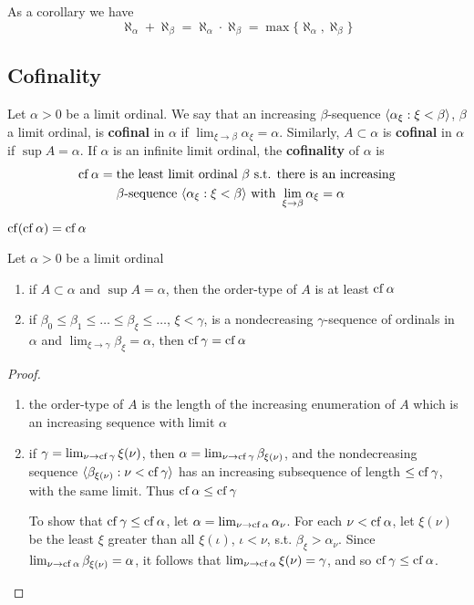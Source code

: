 \documentclass[11pt]{article}
\begin{document}
As a corollary we have
\begin{equation*}
\aleph_\alpha+\aleph_\beta=\aleph_\alpha\cdot\aleph_\beta=\max\{\aleph_\alpha,\aleph_\beta\}
\end{equation*}
\subsection{Cofinality}
\label{sec:org56e0ac6}
Let \(\alpha>0\) be a limit ordinal. We say that an increasing \(\beta\)-sequence \(\langle\alpha_\xi:\xi<\beta\rangle\), \(\beta\) a limit
ordinal, is \textbf{cofinal} in \(\alpha\) if \(\lim_{\xi\to\beta}\alpha_\xi=\alpha\). Similarly, \(A\subset\alpha\) is \textbf{cofinal} in \(\alpha\)
if \(\sup A=\alpha\). If \(\alpha\) is an infinite limit ordinal, the \textbf{cofinality} of \(\alpha\) is
\begin{align*}
\operatorname{cf}\alpha=\;&\text{the least limit ordinal $\beta$ s.t. there is an increasing}\\
&\beta\text{-sequence }\langle\alpha_\xi:\xi<\beta\rangle\text{ with }\lim_{\xi\to\beta}\alpha_\xi=\alpha
\end{align*}

\begin{lemma}
\(\operatorname{cf}(\operatorname{cf}\alpha)=\operatorname{cf}\alpha\)
\end{lemma}

\begin{lemma}[]
\label{lemma3.7}
Let \(\alpha>0\) be a limit ordinal
\begin{enumerate}
\item if \(A\subset\alpha\) and \(\sup A=\alpha\), then the order-type of \(A\) is at least \(\operatorname{cf}\alpha\)
\item if \(\beta_0\le\beta_1\le\dots\le\beta_\xi\le\dots\), \(\xi<\gamma\), is a nondecreasing \(\gamma\)-sequence of ordinals in \(\alpha\)
and \(\lim_{\xi\to\gamma}\beta_\xi=\alpha\), then \(\operatorname{cf}\gamma=\operatorname{cf}\alpha\)
\end{enumerate}
\end{lemma}

\begin{proof}
\begin{enumerate}
\item the order-type of \(A\) is the length of the increasing enumeration of \(A\) which is an
increasing sequence with limit \(\alpha\)
\item if \(\gamma=\lim_{\nu\to\operatorname{cf}\gamma}\xi(\nu)\), then \(\alpha=\lim_{\nu\to\operatorname{cf}\gamma}\beta_{\xi(\nu)}\), and the nondecreasing sequence
\(\langle\beta_{\xi(\nu)}:\nu<\operatorname{cf}\gamma\rangle\) has an increasing subsequence of length \(\le\operatorname{cf}\gamma\), with the same limit.
Thus \(\operatorname{cf}\alpha\le\operatorname{cf}\gamma\)

To show that \(\operatorname{cf}\gamma\le\operatorname{cf}\alpha\), let \(\alpha=\lim_{\nu\to\operatorname{cf}\alpha}\alpha_\nu\). For each \(\nu<\operatorname{cf}\alpha\), let \(\xi(\nu)\) be
the least \(\xi\) greater than all \(\xi(\iota)\), \(\iota<\nu\), s.t. \(\beta_\xi>\alpha_\nu\).
Since \(\lim_{\nu\to\operatorname{cf}\alpha}\beta_{\xi(\nu)}=\alpha\), it follows that \(\lim_{\nu\to\operatorname{cf}\alpha}\xi(\nu)=\gamma\), and so \(\operatorname{cf}\gamma\le\operatorname{cf}\alpha\).
\end{enumerate}
\end{proof}
\end{document}
